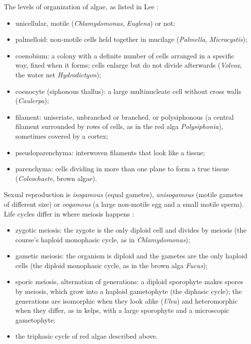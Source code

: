The levels of organization of algae, as
listed in Lee
\cite[Chapters 2, 4 and 5]{lee2008phycology}:
\begin{itemize}
\item unicellular, motile
(\emph{Chlamydomonas}, \emph{Euglena}) or
not;
\item palmelloid: non-motile cells held
together in mucilage (\emph{Palmella},
\emph{Microcystis});
\item coenobium: a colony with a definite
number of cells arranged in a specific way,
fixed when it forms; cells enlarge but do not
divide afterwards (\emph{Volvox}, the water
net \emph{Hydrodictyon});
\item coenocyte (siphonous thallus): a large
multinucleate cell without cross walls
(\emph{Caulerpa});
\item filament: uniseriate, unbranched or
branched, or polysiphonous (a central
filament surrounded by rows of cells, as in
the red alga \emph{Polysiphonia}), sometimes
covered by a cortex;
\item pseudoparenchyma: interwoven filaments
that look like a tissue;
\item parenchyma: cells dividing in more than
one plane to form a true tissue
(\emph{Coleochaete}, brown algae).
\end{itemize}

Sexual reproduction is \emph{isogamous}
(equal gametes), \emph{anisogamous} (motile
gametes of different size) or \emph{oogamous}
(a large non-motile egg and a small motile
sperm). Life cycles differ in where meiosis
happens \cite[Chapter 12]{evert2013raven}:
\begin{itemize}
\item zygotic meiosis: the zygote is the only
diploid cell and divides by meiosis (the
course's haploid monophasic cycle, as in
\emph{Chlamydomonas});
\item gametic meiosis: the organism is
diploid and the gametes are the only haploid
cells (the diploid monophasic cycle, as in
the brown alga \emph{Fucus});
\item sporic meiosis, alternation of
generations: a diploid sporophyte makes
spores by meiosis, which grow into a haploid
gametophyte (the diphasic cycle); the
generations are isomorphic when they look
alike (\emph{Ulva}) and heteromorphic when
they differ, as in kelps, with a large
sporophyte and a microscopic gametophyte;
\item the triphasic cycle of red algae
described above.
\end{itemize}

